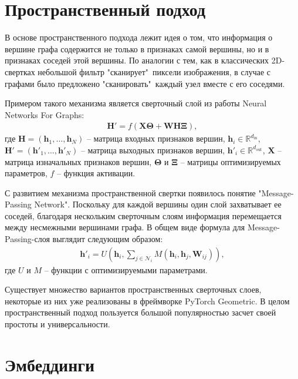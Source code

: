 \documentclass[]{article}
\let\v\mathbf
\begin{document}
\section{Пространственный подход}

В основе пространственного подхода лежит идея о том, что информация о вершине графа содержится не только в признаках самой вершины, но и в признаках соседей этой вершины. По аналогии с тем, как в классических 2D-свертках небольшой фильтр "сканирует"\ пиксели изображения, в случае с графами было предложено "сканировать"\ каждый узел вместе с его соседями. 

Примером такого механизма является сверточный слой из работы Neural Networks For Graphs\cite{micheli2009neural}:
\begin{align}
    \v{H}'=f\left(\v{X}\v{\Theta}+\v{W}\v{H}\v{\Xi}\right),
\end{align}
где $\v{H}=(\v{h}_1,\dots,\v{h}_N)$ --  матрица входных признаков вершин, $\v{h}_i\in\mathbb{R}^{d_{\text{in}}}$, $\v{H}'=(\v{h}'_1,\dots,\v{h}'_N)$ --  матрица выходных признаков вершин, $\v{h}'_i\in\mathbb{R}^{d_{\text{out}}}$, $\v{X}$ -- матрица изначальных признаков вершин, $\v{\Theta}$ и $\v{\Xi}$ -- матрицы оптимизируемых параметров, $f$ -- функция активации.

С развитием механизма пространственной свертки появилось понятие "Message-Passing Network"\cite{gilmer2017neural}. Поскольку для каждой вершины один слой захватывает ее соседей, благодаря нескольким сверточным слоям информация перемещается между несмежными вершинами графа. В общем виде формула для Message-Passing-слоя выглядит следующим образом:
\begin{align}
    \v{h}'_i=U\left(\v{h}_i, \sum_{j\in\mathcal{N}_i}M\left(\v{h}_i, \v{h}_j, \v{W}_{ij}\right)\right),
\end{align}
где $U$ и $M$ -- функции с оптимизируемыми параметрами. 

Существует множество вариантов пространственных сверточных слоев, некоторые из них уже реализованы в фреймворке PyTorch Geometric\cite{fey2019fast}. В целом пространственный подход пользуется большой популярностью засчет своей простоты и универсальности. 

\section{Эмбеддинги}
\end{document}
